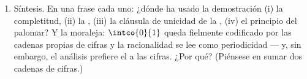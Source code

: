 \begin{problem}
\begin{enumerate}[resume]
        ordenador no vale exactamente $0.3$.
  \item Síntesis. En una frase cada uno: ¿dónde ha usado la
        demostración (i) la completitud, (ii) la
        , (iii) la cláusula de unicidad de la
        , (iv) el principio del palomar? Y la moraleja:
        $\intco{0}{1}$ queda fielmente codificado por las cadenas
        propias de cifras y la racionalidad se lee como periodicidad
        --- y, sin embargo, el análisis prefiere el  a las
        cifras. ¿Por qué? (Piénsese en sumar dos cadenas de cifras.)
\end{enumerate}
\end{problem}
